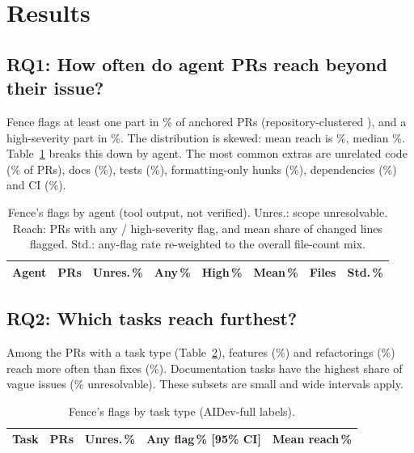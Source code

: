\documentclass[10pt,conference]{IEEEtran}
\begin{document}
\section{Results}
\subsection*{RQ1: How often do agent PRs reach beyond their issue?}
Fence flags at least one part in \pctReach\% \ciReach{} of anchored PRs (repository-clustered \ciReachRepo), and a high-severity part in \pctReachHigh\%. The distribution is skewed: mean reach is \meanReach\%, median \medianReach\%. Table~\ref{tab:agents} breaks this down by agent. The most common extras are unrelated code (\catUnrel\% of PRs), docs (\catDocs\%), tests (\catTests\%), formatting-only hunks (\catFmt\%), dependencies (\catDeps\%) and CI (\catCI\%).

\begin{table}[t]\centering\caption{Fence's flags by agent (tool output, not verified). Unres.: scope unresolvable. Reach: PRs with any / high-severity flag, and mean share of changed lines flagged. Std.: any-flag rate re-weighted to the overall file-count mix.}\label{tab:agents}
\footnotesize\setlength{\tabcolsep}{2.6pt}\begin{tabular}{@{}lrrrrrrr@{}}\toprule
Agent & PRs & Unres.\,\% & Any\,\% & High\,\% & Mean\,\% & Files & Std.\,\%\\\midrule

\end{tabular}\end{table}

\subsection*{RQ2: Which tasks reach furthest?}
Among the \nTyped{} PRs with a task type (Table~\ref{tab:tasks}), features (\taskFeat\%) and refactorings (\taskRefactor\%) reach more often than fixes (\taskFix\%). Documentation tasks have the highest share of vague issues (\unresDocsTask\% unresolvable). These subsets are small and wide intervals apply.

\begin{table}[t]\centering\caption{Fence's flags by task type (AIDev-full labels).}\label{tab:tasks}
\footnotesize\begin{tabular}{@{}lrrrr@{}}\toprule
Task & PRs & Unres.\,\% & Any flag\,\% [95\% CI] & Mean reach\,\%\\\midrule

\end{tabular}\end{table}
\end{document}
